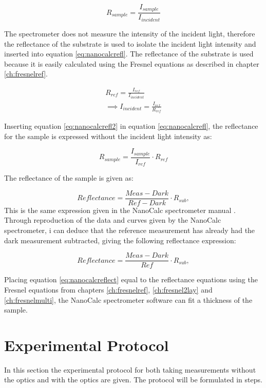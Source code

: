 \documentclass[MasterThesisMain.tex]{subfiles}
\begin{document}
\begin{equation}\label{eq:nanocalcrefl}
R_{sample} = \frac{I_{sample}}{I_{incident}}
\end{equation}

The spectrometer does not measure the intensity of the incident light, therefore the reflectance of the substrate is used to isolate the incident light intensity and inserted into equation \ref{eq:nanocalcrefl}. The reflectance of the substrate is used because it is easily calculated using the Fresnel equations as described in chapter \ref{ch:fresnelref}.

\begin{align}
R_{ref} = \frac{I_{ref}}{I_{incident}}\\
\implies  I_{incident} = \frac{I_{ref}}{R_{ref}} \label{eq:nanocalcrefl2}
\end{align}

Inserting equation \ref{eq:nanocalcrefl2} in equation \ref{eq:nanocalcrefl}, the reflectance for the sample is expressed without the incident light intensity as:

\begin{equation}
R_{sample} = \frac{I_{sample}}{I_{ref}} \cdot R_{ref}
\end{equation}

The reflectance of the sample is given as:

\begin{equation}
Reflectance = \frac{Meas-Dark}{Ref-Dark} \cdot R_{sub},
\end{equation}
This is the same expression given in the NanoCalc spectrometer manual \cite{nanocalcmanual}. Through reproduction of the data and curves given by the NanoCalc spectrometer, i can deduce that the reference measurement has already had the dark measurement subtracted, giving the following reflectance expression:

\begin{equation}\label{eq:nanocalcreflect}
Reflectance = \frac{Meas-Dark}{Ref} \cdot R_{sub},
\end{equation}

Placing equation \ref{eq:nanocalcreflect} equal to the reflectance equations using the Fresnel equations from chapters  \ref{ch:fresnelref}, \ref{ch:fresnel2lay} and \ref{ch:fresnelmulti}, the NanoCalc spectrometer software can fit a thickness of the sample.


\section{Experimental Protocol}
In this section the experimental protocol for both taking measurements without the optics and with the optics are given. The protocol will be formulated in steps.
\end{document}
